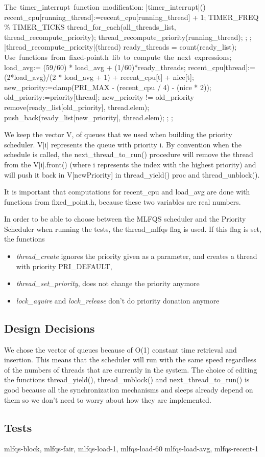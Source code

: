 	\begin{program}
	\mbox{The timer\_interrupt function modification:}     
	\PROC |timer\_interrupt|() \BODY
		recent\_cpu[running\_thread]:=recent\_cpu[running\_thread] + 1;
		\IF TIMER\_FREQ \% TIMER\_TICKS  
		      \THEN thread\_for\_each(all\_threads\_list, thread\_recompute\_priority); 
		      \ELSE thread\_recompute\_priority(running\_thread);
		\FI;
	\END;
	\PROC |thread\_recompute\_priority|(thread) \BODY
		ready\_threads = count(ready\_list);
		\mbox{Use functions from fixed-point.h lib to compute the next expressions};
		load\_avg:= (59/60) * load\_avg + (1/60)*ready_threads; 
		recent\_cpu[thread]:= (2*load\_avg)/(2 * load\_avg + 1) + recent\_cpu[t] + nice[t];
		new\_priority:=clamp(PRI\_MAX - (recent\_cpu / 4) - (nice * 2));
		old\_priority:=priority[thread];
		\IF new\_priority != old\_priority
		      \THEN remove(ready\_list[old\_priority], thread.elem);
			    push\_back(ready\_list[new\_priority], thread.elem);
		\FI;
	\END;
	\end{program}
	We keep the vector V, of queues that we used when building the priority scheduler. V[i] represents the queue with priority i. By convention when the schedule is called, the next\_thread\_to\_run() procedure will remove the thread from the V[i].front() (where i represents the index with the highest priority) and will push it back in V[newPriority] in thread\_yield() proc and thread\_unblock().

	It is important that computations for recent\_cpu and load\_avg are done with functions from fixed\_point.h, because these two variables are real numbers.

	In order to be able to choose between the MLFQS scheduler and the Priority Scheduler when running the tests, the thread\_mlfqs flag is used. If this flag is set, the functions 
	\begin{itemize}
	  \item \textit{thread\_create} ignores the priority given as a parameter, and creates a thread with priority PRI\_DEFAULT,
	  \item \textit{thread\_set\_priority}, does not change the priority anymore
	  \item \textit{lock\_aquire} and \textit{lock\_release} don't do priority donation anymore
	\end{itemize}

    \subsection{Design Decisions}
We chose the vector of queues because of O(1) constant time retrieval and insertion. This means that the scheduler will run with the same speed regardless of the numbers of threads that are currently in the system. The choice of editing the functions thread\_yield(), thread\_unblock() and next\_thread\_to\_run() is good because all the synchronization mechanisms and sleeps already depend on them so we don't need to worry about how they are implemented.
    \subsection{Tests}
	mlfqs-block, mlfqs-fair, mlfqs-load-1, mlfqs-load-60 mlfqs-load-avg, mlfqs-recent-1
